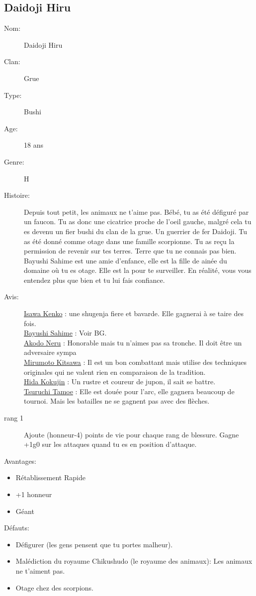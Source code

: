 \documentclass[oneside,12pt]{book}
\begin{document}
\begin{flushleft}
\clearpage

\section{Daidoji Hiru}
\begin{description}
\item[Nom:]{Daidoji Hiru}
\item[Clan:]{Grue}
\item[Type:]{Bushi}
\item[Age:]{18 ans}
\item[Genre:]{H}
\item[Histoire:]{
Depuis tout petit, les animaux ne t'aime pas. Bébé, tu as été défiguré par un faucon. Tu as donc une cicatrice proche de l'oeil gauche, malgré cela tu es devenu un fier bushi du clan de la grue. Un guerrier de fer Daidoji. Tu as été donné comme otage dans une famille scorpionne. Tu as reçu la permission de revenir sur tes terres. Terre que tu ne connais pas bien. Bayushi Sahime est une amie d'enfance, elle est la fille de ainée du domaine où tu es otage. Elle est la pour te surveiller. En réalité, vous vous entendez plus que bien et tu lui fais confiance. 
\vspace{0.2cm}
}
\item[Avis:]{
\underline{Isawa Kenko} : une shugenja fiere et bavarde. Elle gagnerai à se taire des fois.\\
\underline{Bayushi Sahime} : Voir BG.\\
\underline{Akodo Neru} : Honorable mais tu n'aimes pas sa tronche. Il doit être un adversaire sympa\\
\underline{Mirumoto Kitsawa} : Il est un bon combattant mais utilise des techniques originales qui ne valent rien en comparaison de la tradition. \\
\underline{Hida Kokujin} : Un rustre et coureur de jupon, il sait se battre. \\
\underline{Tsuruchi Tamoe} : Elle est douée pour l'arc, elle gagnera beaucoup de tournoi. Mais les batailles ne se gagnent pas avec des flèches.\\
}
\item[rang 1]{
Ajoute (honneur-4) points de vie pour chaque rang de blessure. Gagne +1g0 sur les attaques quand tu es en position d'attaque.
}
\end{description}
\vspace{0.2cm}
Avantages:
\begin{itemize}
\item Rétablissement Rapide
\item +1 honneur
\item Géant
\end{itemize}
Défauts:
\begin{itemize}
\item Défigurer (les gens pensent que tu portes malheur).
\item Malédiction du royaume Chikushudo (le royaume des animaux): Les animaux ne t'aiment pas.
\item Otage chez des scorpions.
\end{itemize}



\end{flushleft}
\end{document}

